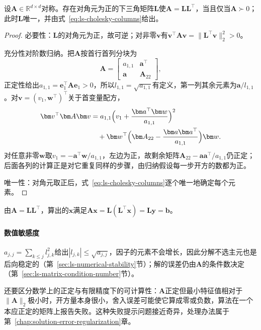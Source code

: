 \begin{theorem}[Cholesky分解的存在与唯一]
\label{thm:ls-cholesky-existence}
设$\bm A\in\mathbb R^{d\times d}$对称。存在对角元为正的下三角矩阵$\bm L$使$\bm A=\bm L\bm L^\top$，当且仅当$\bm A\succ0$；此时$\bm L$唯一，并由式~\eqref{eq:ls-cholesky-columns}给出。
\end{theorem}
\begin{proof}
必要性：$\bm L$的对角元为正，故可逆；对非零$\bm v$有$\bm v^\top\bm A\bm v=\lVert\bm L^\top\bm v\rVert_2^2>0$。

充分性对阶数归纳。把$\bm A$按首行首列分块为
\[
 \bm A=\begin{bmatrix}a_{1,1}&\bm a^\top\\\bm a&\bm A_{22}\end{bmatrix},
\]
正定性给出$a_{1,1}=\bm e_1^\top\bm A\bm e_1>0$，所以$l_{1,1}=\sqrt{a_{1,1}}$有定义，第一列其余元素为$\bm a/l_{1,1}$。对$\bm v=(v_1,\bm w^\top)^\top$关于首变量配方，
\[
\begin{aligned}
 \bm v^\top\bm A\bm v
 &=a_{1,1}\Bigl(v_1+\frac{\bm a^\top\bm w}{a_{1,1}}\Bigr)^2\\
 &\quad+\bm w^\top\Bigl(\bm A_{22}-\frac{\bm a\bm a^\top}{a_{1,1}}\Bigr)\bm w .
\end{aligned}
\]
对任意非零$\bm w$取$v_1=-\bm a^\top\bm w/a_{1,1}$，左边为正，故剩余矩阵$\bm A_{22}-\bm a\bm a^\top/a_{1,1}$仍正定；后面各列的计算正是对它重复同样的步骤，由归纳假设每一步开方的数都为正。

唯一性：对角元取正后，式~\eqref{eq:ls-cholesky-columns}逐个唯一地确定每个元素。
\end{proof}

由$\bm A=\bm L\bm L^\top$，算出的$\bm x$满足$\bm A\bm x=\bm L(\bm L^\top\bm x)=\bm L\bm y=\bm b$。

\paragraph{数值敏感度}
$a_{j,j}=\sum_{k\leq j}l_{j,k}^2$给出$|l_{j,k}|\leq\sqrt{a_{j,j}}$，因子的元素不会增长，因此分解不选主元也是后向稳定的（第~\ref{sec:ls-numerical-stability}节）；解的误差仍由$\bm A$的条件数决定（第~\ref{sec:ls-matrix-condition-number}节）。

还要区分数学上的正定与有限精度下的可计算性：$\bm A$正定但最小特征值相对于$\lVert\bm A\rVert_2$极小时，开方量本身很小，舍入误差可能使它算成零或负数，算法在一个本应正定的矩阵上报告失败。这种失败提示问题接近奇异，处理办法属于第~\ref{chap:solution-error-regularization}章。

